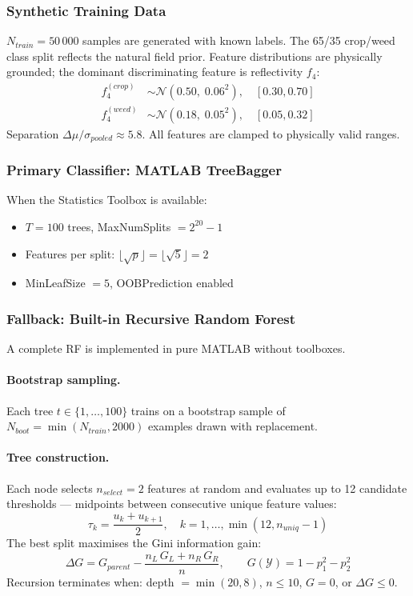 \documentclass[12pt,a4paper]{article}
\begin{document}
\subsubsection{Synthetic Training Data}
$N_{train} = 50\,000$ samples are generated with known labels.  The 65/35 crop/weed
class split reflects the natural field prior.  Feature distributions are physically
grounded; the dominant discriminating feature is reflectivity $f_4$:
\begin{align}
    f_4^{(crop)} &\sim \mathcal{N}(0.50,\;0.06^2),\quad[0.30,0.70] \\
    f_4^{(weed)} &\sim \mathcal{N}(0.18,\;0.05^2),\quad[0.05,0.32]
\end{align}
Separation $\Delta\mu/\sigma_{pooled} \approx 5.8$.  All features are clamped
to physically valid ranges.

\subsubsection{Primary Classifier: MATLAB TreeBagger}
When the Statistics Toolbox is available:
\begin{itemize}
    \item $T = 100$ trees, MaxNumSplits $= 2^{20}-1$
    \item Features per split: $\lfloor\sqrt{p}\rfloor = \lfloor\sqrt{5}\rfloor = 2$
    \item MinLeafSize $= 5$, OOBPrediction enabled
\end{itemize}

\subsubsection{Fallback: Built-in Recursive Random Forest}
A complete RF is implemented in pure MATLAB without toolboxes.

\paragraph{Bootstrap sampling.}
Each tree $t\in\{1,\ldots,100\}$ trains on a bootstrap sample of
$N_{boot}=\min(N_{train},2000)$ examples drawn with replacement.

\paragraph{Tree construction.}
Each node selects $n_{select}=2$ features at random and evaluates up to 12
candidate thresholds --- midpoints between consecutive unique feature values:
\begin{equation}
    \tau_k = \frac{u_k + u_{k+1}}{2},\quad k=1,\ldots,\min(12, n_{uniq}-1)
\end{equation}
The best split maximises the Gini information gain:
\begin{equation}
    \Delta G = G_{parent} - \frac{n_L\,G_L + n_R\,G_R}{n},
    \qquad G(\mathcal{Y}) = 1 - p_1^2 - p_2^2
    \label{eq:gini}
\end{equation}
Recursion terminates when: depth $= \min(20, 8)$, $n \leq 10$, $G = 0$, or
$\Delta G \leq 0$.
\end{document}
